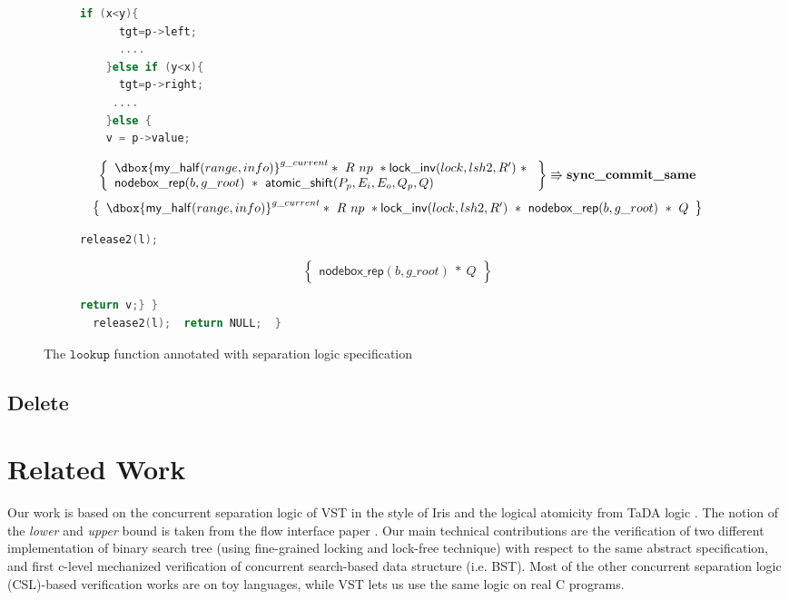 \documentclass[acmsmall,screen]{acmart}\settopmatter{printfolios=true}
\newcommand\dboxed[1]{\dbox{\ensuremath{#1}}}
\newcommand{\ghost}[2]{\ensuremath{\dboxed{#1}^{#2}}}
\begin{document}
\begin{figure}[htp]
\begin{subfigure}[t]{1\textwidth}
      \begin{lstlisting}[language = C,  numbers = none]
    if (x<y){
      tgt=p->left;
      ....
    }else if (y<x){
      tgt=p->right;
     ....
    }else {
    v = p->value;
           \end{lstlisting} 
  $$\left\{\begin{array}{l} \ghost{\mathsf{my\_half}(range,info)}{g\_current}*\ R\ np\ *\mathsf{lock\_inv}(lock,lsh2,R')\ *\ \\\mathsf{nodebox\_rep}(b,g\_root)\ *\ \mathsf{atomic\_shift}(P_p,E_i,E_o,Q_p,Q)\end{array}\right\} \Rrightarrow{\textbf{sync\_commit\_same}}$$
$$\left\{\begin{array}{l} \ghost{\mathsf{my\_half}(range,info)}{g\_current}*\ R\ np\ *\mathsf{lock\_inv}(lock,lsh2,R')\ *\ \mathsf{nodebox\_rep}(b,g\_root)\ *\ Q\end{array}\right\}$$
        \begin{lstlisting}[language = C,  numbers = none]
      release2(l);
         \end{lstlisting}
       $$\left\{\begin{array}{l} \mathsf{nodebox\_rep}(b,g\_root)\ *\ Q\end{array}\right\}$$
         \begin{lstlisting}[language = C, numbers = none]
       return v;} }
  release2(l);  return NULL;  }
 \end{lstlisting} 
\end{subfigure}
\caption{The $\texttt{lookup}$ function annotated with separation logic specification}
\label{lookupproof}
\end{figure} 

\subsection{Delete}

\section{Related Work}
Our work is based on the concurrent separation logic of VST in the style of Iris \cite{higherorderghoststate} and the logical atomicity from TaDA logic  \cite{tada}. The notion of the \emph{lower} and \emph{upper} bound is taken from the flow interface paper \cite{krishna2017flow}. Our main technical contributions are the verification of two different implementation of binary search tree (using fine-grained locking and lock-free technique) with respect to the same abstract specification, and first c-level mechanized verification of concurrent search-based data structure (i.e. BST). Most of the other concurrent separation logic (CSL)-based verification works are on toy languages, while VST lets us use the same logic on real C programs. 
\end{document}
